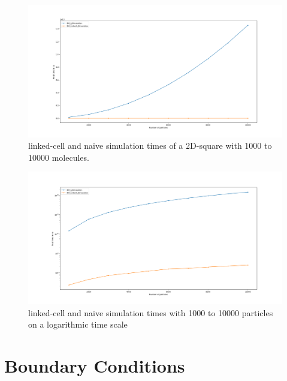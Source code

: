 \documentclass{article}
\begin{document}
\FloatBarrier

\begin{figure}[H]
    \includegraphics[width=\textwidth]{res/lj_big_plot_linear}
    \caption{linked-cell and naive simulation times of a 2D-square with 1000 to 10000 molecules.}
    \label{fig:timelc}
\end{figure}

\begin{figure}[H]
    \includegraphics[width=\textwidth]{res/lj_big_plot_log}
    \caption{linked-cell and naive simulation times with 1000 to 10000 particles on a logarithmic time scale}
    \label{fig:timelclong}
\end{figure}

\section{Boundary Conditions}
\label{sec:bound}
\end{document}
